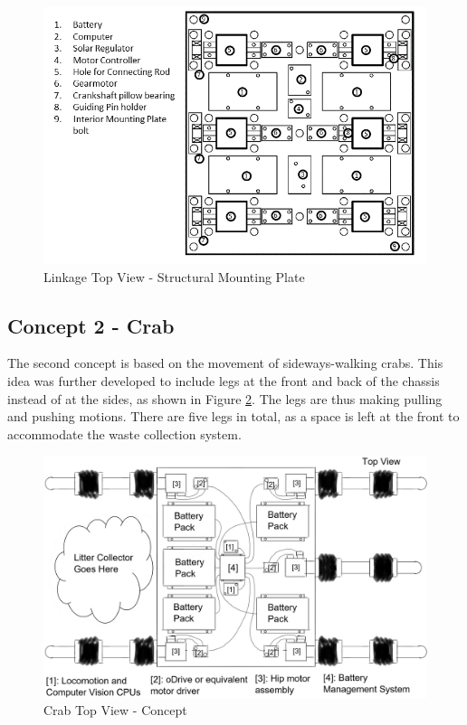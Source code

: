 \begin{figure}[H]
    \centering
    \includegraphics[width=\textwidth]{img/C1/MountingPlate.png}
    \caption{Linkage Top View - Structural Mounting Plate}
    \label{fig:concept1_MountingPlate}
\end{figure}



\subsection{Concept 2 - Crab} \label{subsec:crab}

The second concept is based on the movement of sideways-walking crabs. This idea was further developed to include legs at the front and back of the chassis instead of at the sides, as shown in Figure \ref{fig:crab_top}. The legs are thus making pulling and pushing motions. There are five legs in total, as a space is left at the front to accommodate the waste collection system. 

\begin{figure}[H]
    \centering
    \includegraphics[width=\textwidth]{3_DesignConcepts/img/Crab/crab_top_view.png}
    \caption{Crab Top View - Concept}
    \label{fig:crab_top}
\end{figure}

